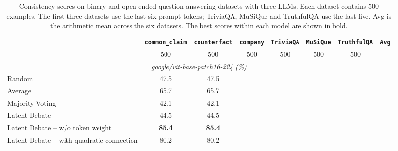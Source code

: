 \begin{table}[tp]
    \centering
    \tiny
    \setlength{\tabcolsep}{2.2mm}
    \begin{threeparttable}
        \begin{tabular}{lccccccc}
            \toprule
            & \textbf{\underline{\texttt{common\_claim}}} & \textbf{\underline{\texttt{counterfact}}} & \textbf{\underline{\texttt{company}}} & \textbf{\underline{\texttt{TriviaQA}}} & \textbf{\underline{\texttt{MuSiQue}}} & \textbf{\underline{\texttt{TruthfulQA}}} & \textbf{\underline{\texttt{Avg}}} \\
            & 500 & 500 & 500 & 500 & 500 & 500 & -- \\
            \midrule
            \multicolumn{8}{c}{\textit{google/vit-base-patch16-224 (\%)}} \\
            \midrule
            Random & 47.5 & 47.5 \\
            Average & 65.7 & 65.7 \\
            Majority Voting & 42.1 & 42.1 \\
            \rowcolor{gray!10}
            Latent Debate & 44.5 & 44.5 \\
            Latent Debate -- w/o token weight & \textbf{85.4} & \textbf{85.4} \\
            Latent Debate -- with quadratic connection & 80.2 & 80.2 \\
            \bottomrule
        \end{tabular}
        \caption{Consistency scores on binary and open-ended question-answering datasets with three LLMs. Each dataset contains 500 examples. The first three datasets use the last six prompt tokens; TriviaQA, MuSiQue and TruthfulQA use the last five. Avg is the arithmetic mean across the six datasets. The best scores within each model are shown in bold.}
        \label{tab:correlation}
    \end{threeparttable}
    \vspace{-10pt}
\end{table}
